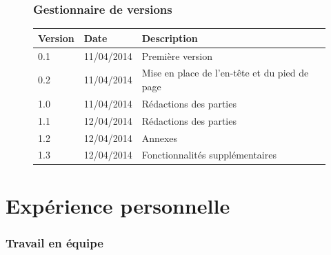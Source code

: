 \documentclass[12pt]{article}
\begin{document}
\setcounter{page}{2}
    	\begin{figure}[h]
        	\section*{Gestionnaire de versions}
		\centering
        	\begin{tabular}{|l|l|l|}
			\hline
            	\textbf{Version} & \textbf{Date} & \textbf{Description} \\
            	\hline
            	\hline
            		0.1 & 11/04/2014 & Première version \\
            	\hline
			0.2 & 11/04/2014 & Mise en place de l'en-tête et du pied de page \\
            	\hline
			1.0 & 11/04/2014 & Rédactions des parties \\
            	\hline
			1.1 & 12/04/2014 & Rédactions des parties \\
            	\hline
            		1.2 & 12/04/2014 & Annexes \\
            	\hline
            		1.3 & 12/04/2014 & Fonctionnalités supplémentaires\\
            	\hline
        	\end{tabular}
    	\end{figure}
\newpage

\renewcommand{\contentsname}{Sommaire}
\tableofcontents



\clearpage
\part*{Expérience personnelle}
\section{Travail en équipe}
\end{document}
